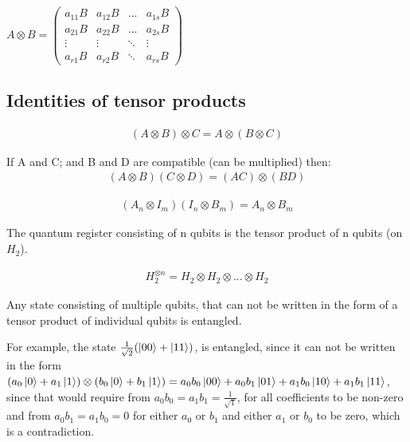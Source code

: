 \begin{center}
  $A \otimes B = \begin{pmatrix}
      a_{11}B & a_{12}B & \dots  & a_{1s}B \\
      a_{21}B & a_{22}B & \dots  & a_{2s}B \\
      \vdots  & \vdots  & \ddots & \vdots  \\
      a_{r1}B & a_{r2}B & \ddots & a_{rs}B
    \end{pmatrix}
  $
\end{center}


\subsection{Identities of tensor products}

\theorem[Associativity]
\begin{align}
  (A \otimes B) \otimes C = A \otimes (B \otimes C)
\end{align}

 If A and C; and B and D are compatible (can be multiplied) then:
\begin{align}
  (A \otimes B)(C \otimes D) = (AC) \otimes (BD)
\end{align}


\begin{align}
  (A_n \otimes I_m)(I_n \otimes B_m) = A_n \otimes B_m
\end{align}

 The quantum register consisting of n qubits is the tensor product of n qubits (on $H_2$).

\begin{align}
H_2^{\otimes{}n} = H_2 \otimes H_2 \otimes ... \otimes H_2
\end{align}

 Any state consisting of multiple qubits, that can not be written in the form of a tensor product of individual qubits is entangled.

For example, the state $\frac{1}{\sqrt{2}}(\ket{00} + \ket{11})$, is entangled, since it can not be written in the form $(a_0\ket{0} + a_1\ket{1})\otimes(b_0\ket{0}+b_1\ket{1}) = a_0b_0\ket{00}+a_0b_1\ket{01}+a_1b_0\ket{10}+a_1b_1\ket{11}$, since that would require from $a_0b_0 = a_1b_1 = \frac{1}{\sqrt{1}}$, for all coefficients to be non-zero and from $a_0b_1 = a_1b_0 = 0$ for either $a_0$ or $b_1$ and either $a_1$ or $b_0$ to be zero, which is a contradiction.